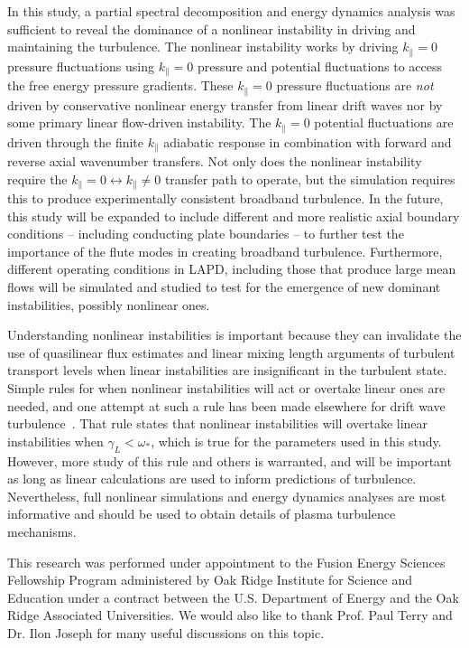 \documentclass[showpacs,preprintnumbers,amsmath,amssymb,superscriptaddress,aip]{revtex4-1}
\begin{document}
In this study, a partial spectral decomposition and energy dynamics analysis was sufficient to reveal the dominance of a nonlinear instability in driving and maintaining the turbulence.
The nonlinear instability works by driving $k_\parallel = 0$ pressure fluctuations using $k_\parallel = 0$ pressure and potential fluctuations to access the free energy pressure gradients.
These $k_\parallel = 0$ pressure fluctuations are \emph{not} driven by conservative nonlinear energy transfer from linear drift waves nor by some primary linear flow-driven instability.
The $k_\parallel = 0$ potential fluctuations are driven through the finite $k_\parallel$ adiabatic response in combination with forward and reverse axial wavenumber transfers. Not only
does the nonlinear instability require the $k_\parallel = 0 \leftrightarrow k_\parallel \ne 0$ transfer path to operate, but the simulation requires this to produce experimentally
consistent broadband turbulence. In the future, this study will be expanded to include different and more realistic axial boundary conditions -- including conducting plate boundaries --
to further test the importance of the flute modes in creating broadband turbulence. Furthermore, different operating conditions in LAPD, including those that produce large mean flows
will be simulated and studied to test for the emergence of new dominant instabilities, possibly nonlinear ones.
 
Understanding nonlinear instabilities is important because they can invalidate the use of quasilinear flux estimates and linear mixing length arguments of turbulent transport 
levels when linear instabilities are insignificant in the turbulent state. Simple rules for when nonlinear instabilities will act or overtake linear ones are needed, and one attempt at such
a rule has been made elsewhere for drift wave turbulence~\cite{scott2005}. That rule states that nonlinear instabilities will overtake linear instabilities when $\gamma_L < \omega_*$, which is true
for the parameters used in this study. However, more study of this rule and others is warranted, and will be important as long as linear calculations are used to inform predictions of turbulence.
Nevertheless, full nonlinear simulations and energy dynamics analyses
are most informative and should be used to obtain details of plasma
turbulence mechanisms.


\begin{acknowledgments}
This research was performed under appointment to the Fusion Energy Sciences Fellowship Program administered by Oak Ridge Institute for
Science and Education under a contract between the U.S. Department of Energy and the Oak Ridge Associated Universities. 
We would also like to thank Prof. Paul Terry and Dr. Ilon Joseph for many useful discussions on this topic.
\end{acknowledgments}
\end{document}
